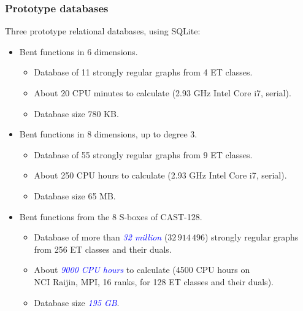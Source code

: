 \documentclass[pdf,sprung,slideColor,nocolorBG]{beamer}
\newenvironment{colortheme}[1]{
\def\ProvidesPackageRCS $##1${\relax}
\renewcommand{\ProcessOptions}{\relax}
\makeatletter

\makeatother
}{}
\newcommand{\Emph}[1]{\emph{\textcolor{blue}{#1}}}
\begin{document}
\begin{colortheme}{jubata}

\begin{frame}
\frametitle{Prototype databases}
Three prototype relational databases, using SQLite:

\begin{itemize}
 \item\normalsize{}
Bent functions in 6 dimensions.
 \begin{itemize}
  \item\footnotesize{}
Database of 11 strongly regular graphs from 4 ET classes.
  \item\footnotesize{}
About 20 CPU minutes to calculate (2.93 GHz Intel Core i7, serial).
  \item\footnotesize{}
Database size 780 KB.
 \end{itemize}

 \item\normalsize{}
Bent functions in 8 dimensions, up to degree 3.
 \begin{itemize}
  \item\footnotesize{}
Database of 55 strongly regular graphs from 9 ET classes.
  \item\footnotesize{}
About 250 CPU hours to calculate (2.93 GHz Intel Core i7, serial).
  \item\footnotesize{}
Database size 65 MB.
 \end{itemize}

 \item\normalsize{}
Bent functions from the 8 S-boxes of CAST-128.
 \begin{itemize}
  \item\footnotesize{}
Database of more than \Emph{32 million} ($32\,914\,496$) strongly regular graphs from 256 ET classes and their duals.
  \item\footnotesize{}
About \Emph{9000 CPU hours} to calculate
(4500 CPU hours on\\NCI Raijin, MPI, 16 ranks, for 128 ET classes and their duals).
  \item\footnotesize{}
Database size \Emph{195 GB}.
 \end{itemize}
\end{itemize}

\normalsize{}
\end{frame}


\end{colortheme}
\end{document}
